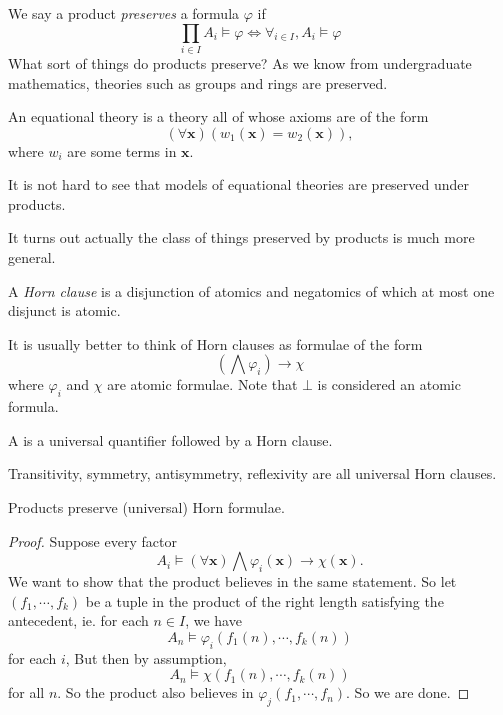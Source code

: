 \documentclass[a4paper]{article}
\begin{document}
We say a product \emph{preserves} a formula $\varphi$ if
\[
  \prod_{i \in I} A_i \vDash \varphi \Longleftrightarrow \forall_{i \in I}, A_i \vDash \varphi
\]
What sort of things do products preserve? As we know from undergraduate mathematics, theories such as groups and rings are preserved.
\begin{defi}
  An equational theory is a theory all of whose axioms are of the form
  \[
    (\forall \mathbf{x}) (w_1(\mathbf{\mathbf{x}}) = w_2(\mathbf{x})),
  \]
  where $w_i$ are some terms in $\mathbf{x}$.
\end{defi}
It is not hard to see that models of equational theories are preserved under products.

It turns out actually the class of things preserved by products is much more general.

\begin{defi}
  A \emph{Horn clause} is a disjunction of atomics and negatomics of which at most one disjunct is atomic. %

  It is usually better to think of Horn clauses as formulae of the form
  \[
    \left(\bigwedge \varphi_i\right) \to \chi
  \]
  where $\varphi_i$ and $\chi$ are atomic formulae. Note that $\bot$ is considered an atomic formula.

  A  is a universal quantifier followed by a Horn clause.
\end{defi}

\begin{eg}
  Transitivity, symmetry, antisymmetry, reflexivity are all universal Horn clauses.
\end{eg}

\begin{prop}
  Products preserve (universal) Horn formulae.
\end{prop}

\begin{proof}
  Suppose every factor
  \[
    A_i \vDash (\forall \mathbf{x}) \bigwedge \varphi_i(\mathbf{x}) \to \chi(\mathbf{x}).
  \]
  We want to show that the product believes in the same statement. So let $(f_1, \cdots, f_k)$ be a tuple in the product of the right length satisfying the antecedent, ie. for each $n \in I$, we have
  \[
    A_n \vDash \varphi_i (f_1(n), \cdots, f_k(n))
  \]
  for each $i$, But then by assumption,
  \[
    A_n \vDash \chi(f_1(n), \cdots, f_k(n))
  \]
  for all $n$. So the product also believes in $\varphi_j(f_1, \cdots, f_n)$. So we are done.
\end{proof}
\end{document}
